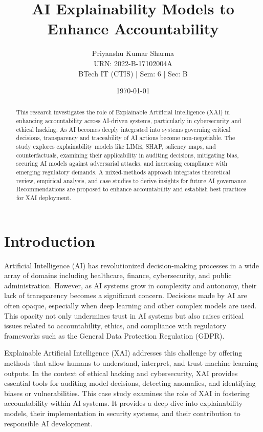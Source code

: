 \documentclass[12pt]{article}
\title{AI Explainability Models to Enhance Accountability}
\author{Priyanshu Kumar Sharma \\ URN: 2022-B-17102004A \\ BTech IT (CTIS) | Sem: 6 | Sec: B}
\date{\today}
\begin{document}
\maketitle

\begin{abstract}
This research investigates the role of Explainable Artificial Intelligence (XAI) in enhancing accountability across AI-driven systems, particularly in cybersecurity and ethical hacking. As AI becomes deeply integrated into systems governing critical decisions, transparency and traceability of AI actions become non-negotiable. The study explores explainability models like LIME, SHAP, saliency maps, and counterfactuals, examining their applicability in auditing decisions, mitigating bias, securing AI models against adversarial attacks, and increasing compliance with emerging regulatory demands. A mixed-methods approach integrates theoretical review, empirical analysis, and case studies to derive insights for future AI governance. Recommendations are proposed to enhance accountability and establish best practices for XAI deployment.
\end{abstract}

\section{Introduction}
Artificial Intelligence (AI) has revolutionized decision-making processes in a wide array of domains including healthcare, finance, cybersecurity, and public administration. However, as AI systems grow in complexity and autonomy, their lack of transparency becomes a significant concern. Decisions made by AI are often opaque, especially when deep learning and other complex models are used. This opacity not only undermines trust in AI systems but also raises critical issues related to accountability, ethics, and compliance with regulatory frameworks such as the General Data Protection Regulation (GDPR).

Explainable Artificial Intelligence (XAI) addresses this challenge by offering methods that allow humans to understand, interpret, and trust machine learning outputs. In the context of ethical hacking and cybersecurity, XAI provides essential tools for auditing model decisions, detecting anomalies, and identifying biases or vulnerabilities. This case study examines the role of XAI in fostering accountability within AI systems. It provides a deep dive into explainability models, their implementation in security systems, and their contribution to responsible AI development.
\end{document}
